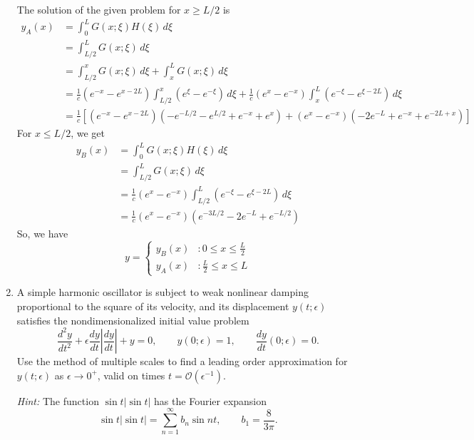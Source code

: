 \documentclass[10pt,letterpaper]{report}
\newcommand{\abs}[1]{\left|{#1}\right|}
\newcommand{\Ord}[1]{\mathcal{O}\left({#1}\right)}
\begin{document}
\begin{enumerate}
The solution of the given problem for $x \geq L/2$ is
\begin{align*}
    y_A(x) &= \int_0^L G(x;\xi)H(\xi)\,d\xi
    \\
    &=
    \int_{L/2}^L G(x;\xi)\,d\xi
    \\
    &=
    \int_{L/2}^x G(x;\xi)\,d\xi + \int_{x}^L G(x;\xi)\,d\xi
    \\
    &=
    \frac{1}{c}\left(e^{-x} - e^{x-2L}\right)\int_{L/2}^x \left(e^{\xi} - e^{-\xi}\right)\,d\xi
    +
    \frac{1}{c}\left(e^{x} - e^{-x}\right)\int_{x}^L\left(e^{-\xi} - e^{\xi-2L}\right)\,d\xi
    \\
    &= \frac{1}{c}\left[\left(e^{-x} - e^{x-2L}\right)\left(-e^{-L/2} - e^{L/2} + e^{-x} + e^x\right) + \left(e^{x} - e^{-x}\right)\left(-2 e^{-L} + e^{-x} + e^{-2 L + x}\right) \right]
\end{align*}
For $x \leq L/2$, we get
\begin{align*}
    y_B(x) &= \int_0^L G(x;\xi)H(\xi)\,d\xi
    \\
    &=
    \int_{L/2}^L G(x;\xi)\,d\xi
    \\
    &=
    \frac{1}{c}\left(e^{x} - e^{-x}\right) \int_{L/2}^L \left(e^{-\xi} - e^{\xi-2L}\right) \,d\xi
    \\
    &=
    \frac{1}{c}\left(e^{x} - e^{-x}\right)\left(e^{-3 L/2} - 2 e^{-L} + e^{-L/2}\right)
\end{align*}
So, we have
\[
y = \begin{cases}
y_B(x) &: 0 \leq x \leq \frac{L}{2} \\
y_A(x) &: \frac{L}{2} \leq x \leq L
\end{cases}
\]


\item \begin{qbox}
A simple harmonic oscillator is subject to weak nonlinear damping proportional to the square of its velocity, and its displacement $y(t; \epsilon)$ satisfies the nondimensionalized initial value problem
\[
\frac{d^2y}{dt^2} + \epsilon\frac{dy}{dt}\abs{\frac{dy}{dt}} + y = 0, \qquad y(0;\epsilon) = 1, \qquad \frac{dy}{dt}(0;\epsilon) = 0.
\]
Use the method of multiple scales to find a leading order approximation for $y(t; \epsilon)$ as $\epsilon\to 0^+$, valid on times $t = \Ord{\epsilon^{-1}}$.

\textit{Hint:} The function $\sin t|\sin t|$ has the Fourier expansion
\[
\sin t \abs{\sin t} = \sum_{n = 1}^\infty b_n \sin nt, \qquad b_1 = \frac{8}{3\pi}.
\]
\end{qbox}


\end{enumerate}
\end{document}
